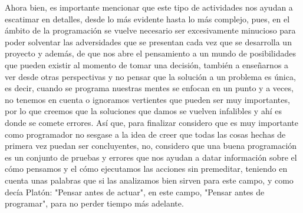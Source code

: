 \documentclass{article}
\begin{document}
Ahora bien, es importante mencionar que este tipo de actividades nos ayudan a escatimar en detalles, desde lo más evidente hasta lo más complejo, pues, en el ámbito de la programación se vuelve necesario ser excesivamente minucioso para poder solventar las adversidades que se presentan cada vez que se desarrolla un proyecto y además, de que nos abre el pensamiento a un mundo de posibilidades que pueden existir al momento de tomar una decisión, también a enseñarnos a ver desde otras perspectivas y no pensar que la solución a un problema es única, es decir, cuando se programa nuestras mentes se enfocan en un punto y a veces, no tenemos en cuenta o ignoramos vertientes que pueden ser muy importantes, por lo que creemos que la soluciones que damos se vuelven infalibles y ahí es donde se comete errores. Así que, para finalizar considero que es muy importante como programador no sesgase a la idea de creer que todas las cosas hechas de primera vez puedan ser concluyentes, no, considero que una buena programación es un conjunto de pruebas y errores que nos ayudan a datar información sobre el cómo pensamos y el cómo ejecutamos las acciones sin premeditar, teniendo en cuenta unas palabras que si las analizamos bien sirven para este campo, y como decía Platón: "Pensar antes de actuar", en este campo, "Pensar antes de programar", para no perder tiempo más adelante.
\end{document}

